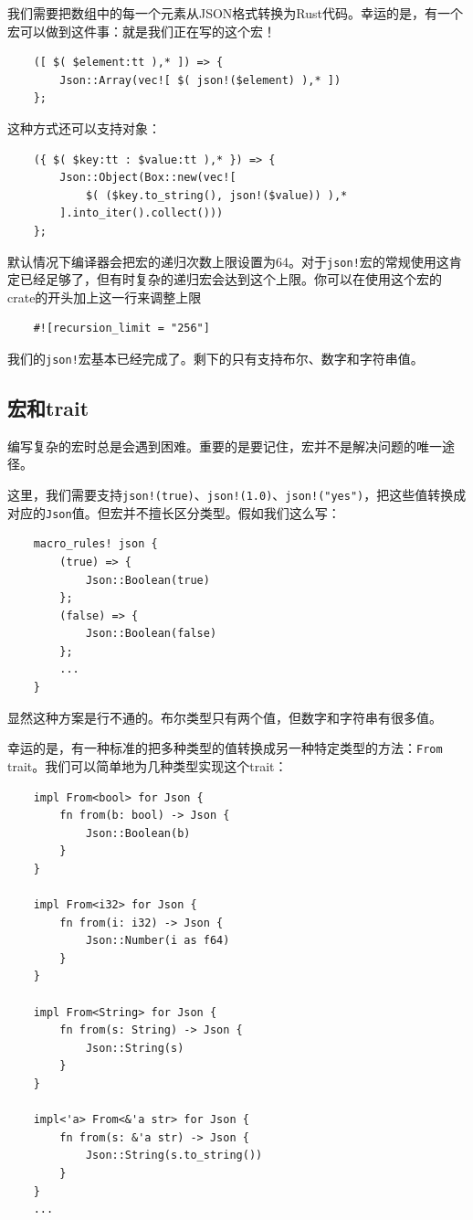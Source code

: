 我们需要把数组中的每一个元素从JSON格式转换为Rust代码。幸运的是，有一个宏可以做到这件事：就是我们正在写的这个宏！
\begin{verbatim}
    ([ $( $element:tt ),* ]) => {
        Json::Array(vec![ $( json!($element) ),* ])
    };
\end{verbatim}

这种方式还可以支持对象：
\begin{verbatim}
    ({ $( $key:tt : $value:tt ),* }) => {
        Json::Object(Box::new(vec![
            $( ($key.to_string(), json!($value)) ),*
        ].into_iter().collect()))
    };
\end{verbatim}

默认情况下编译器会把宏的递归次数上限设置为64。对于\texttt{json!}宏的常规使用这肯定已经足够了，但有时复杂的递归宏会达到这个上限。你可以在使用这个宏的crate的开头加上这一行来调整上限
\begin{verbatim}
    #![recursion_limit = "256"]
\end{verbatim}
我们的\texttt{json!}宏基本已经完成了。剩下的只有支持布尔、数字和字符串值。

\subsection{宏和trait}
编写复杂的宏时总是会遇到困难。重要的是要记住，宏并不是解决问题的唯一途径。

这里，我们需要支持\texttt{json!(true)}、\texttt{json!(1.0)}、\texttt{json!("yes")}，把这些值转换成对应的\texttt{Json}值。但宏并不擅长区分类型。假如我们这么写：
\begin{verbatim}
    macro_rules! json {
        (true) => {
            Json::Boolean(true)
        };
        (false) => {
            Json::Boolean(false)
        };
        ...
    }
\end{verbatim}

显然这种方案是行不通的。布尔类型只有两个值，但数字和字符串有很多值。

幸运的是，有一种标准的把多种类型的值转换成另一种特定类型的方法：\texttt{From} trait。我们可以简单地为几种类型实现这个trait：
\begin{verbatim}
    impl From<bool> for Json {
        fn from(b: bool) -> Json {
            Json::Boolean(b)
        }
    }

    impl From<i32> for Json {
        fn from(i: i32) -> Json {
            Json::Number(i as f64)
        }
    }

    impl From<String> for Json {
        fn from(s: String) -> Json {
            Json::String(s)
        }
    }

    impl<'a> From<&'a str> for Json {
        fn from(s: &'a str) -> Json {
            Json::String(s.to_string())
        }
    }
    ...
\end{verbatim}

